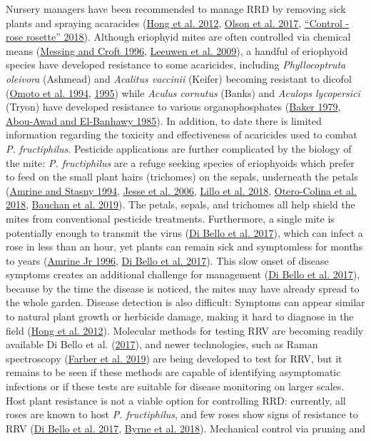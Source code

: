 \documentclass{ufdissertation}[overrideChapters] %
\begin{document}
{Nursery managers have been recommended to manage RRD by removing sick plants and spraying acaracides (\protect\hyperlink{ref-Hong2012}{Hong et al. 2012}, \protect\hyperlink{ref-Olson2017}{Olson et al. 2017}, \protect\hyperlink{ref-UGA2018}{{``Control - rose rosette''} 2018}). Although eriophyid mites are often controlled via chemical means (\protect\hyperlink{ref-Messing1996}{Messing and Croft 1996}, \protect\hyperlink{ref-Leeuwen2009}{Leeuwen et al. 2009}), a handful of eriophyoid species have developed resistance to some acaricides, including \emph{Phyllocoptruta oleivora} (Ashmead) and \emph{Acalitus vaccinii} (Keifer) becoming resistant to dicofol (\protect\hyperlink{ref-Omoto1994}{Omoto et al. 1994}, \protect\hyperlink{ref-Omoto1995}{1995}) while \emph{Aculus cornutus} (Banks) and \emph{Aculops lycopersici} (Tryon) have developed resistance to various organophosphates (\protect\hyperlink{ref-Baker1979}{Baker 1979}, \protect\hyperlink{ref-AbouAwad1985}{Abou-Awad and El-Banhawy 1985}). In addition, to date there is limited information regarding the toxicity and effectiveness of acaricides used to combat \emph{P. fructiphilus}. Pesticide applications are further complicated by the biology of the mite: \emph{P. fructiphilus} are a refuge seeking species of eriophyoids which prefer to feed on the small plant hairs (trichomes) on the sepals, underneath the petals (\protect\hyperlink{ref-Amrine1994}{Amrine and Stasny 1994}, \protect\hyperlink{ref-Jesse2006}{Jesse et al. 2006}, \protect\hyperlink{ref-Lillo2018}{Lillo et al. 2018}, \protect\hyperlink{ref-Otero-Colina2018}{Otero-Colina et al. 2018}, \protect\hyperlink{ref-Bauchan2019}{Bauchan et al. 2019}). The petals, sepals, and trichomes all help shield the mites from conventional pesticide treatments. Furthermore, a single mite is potentially enough to transmit the virus (\protect\hyperlink{ref-Bello2017}{Di Bello et al. 2017}), which can infect a rose in less than an hour, yet plants can remain sick and symptomless for months to years (\protect\hyperlink{ref-Amrine1996}{Amrine Jr 1996}, \protect\hyperlink{ref-Bello2017}{Di Bello et al. 2017}). This slow onset of disease symptoms creates an additional challenge for management (\protect\hyperlink{ref-Bello2017}{Di Bello et al. 2017}), because by the time the disease is noticed, the mites may have already spread to the whole garden. Disease detection is also difficult: Symptoms can appear similar to natural plant growth or herbicide damage, making it hard to diagnose in the field (\protect\hyperlink{ref-Hong2012}{Hong et al. 2012}). Molecular methods for testing RRV are becoming readily available Di Bello et al. (\protect\hyperlink{ref-Bello2017}{2017}), and newer technologies, such as Raman spectroscopy (\protect\hyperlink{ref-Farber2019}{Farber et al. 2019}) are being developed to test for RRV, but it remains to be seen if these methods are capable of identifying asymptomatic infections or if these tests are suitable for disease monitoring on larger scales. Host plant resistance is not a viable option for controlling RRD: currently, all roses are known to host \emph{P. fructiphilus}, and few roses show signs of resistance to RRV (\protect\hyperlink{ref-Bello2017}{Di Bello et al. 2017}, \protect\hyperlink{ref-Byrne2018}{Byrne et al. 2018}). Mechanical control via pruning and }
\end{document}
